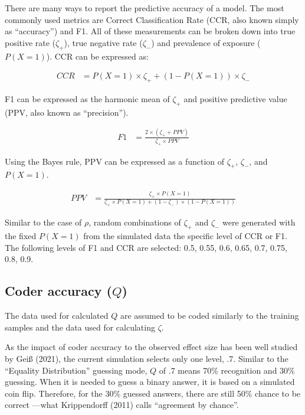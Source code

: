 \documentclass[english,man,floatsintext]{apa6}
\begin{document}
There are many ways to report the predictive accuracy of a model. The most commonly used metrics are Correct Classification Rate (CCR, also known simply as \enquote{accuracy}) and F1. All of these measurements can be broken down into true positive rate (\(\zeta_{+}\)), true negative rate (\(\zeta_{-}\)) and prevalence of exposure (\(P(X = 1)\)). CCR can be expressed as:

\begin{align}
  CCR &= P(X = 1) \times \zeta_{+} + (1 - P(X = 1)) \times \zeta_{-}
\end{align}

F1 can be expressed as the harmonic mean of \(\zeta_{+}\) and positive predictive value (PPV, also known as \enquote{precision}).

\begin{align}
  \label{eq:ppv}
  F1 &= \frac{2 \times (\zeta_{+} + PPV)}{\zeta_{+} \times PPV}
\end{align}

Using the Bayes rule, PPV can be expressed as a function of \(\zeta_{+}\), \(\zeta_{-}\), and \(P(X = 1)\).

\begin{align}
  PPV &= \frac{\zeta_{+} \times P(X = 1)}{\zeta_{+} \times P(X = 1) + (1 - \zeta_{-}) \times (1 - P(X = 1))}
\end{align}

Similar to the case of \(\rho\), random combinations of \(\zeta_{+}\) and \(\zeta_{-}\) were generated with the fixed \(P(X = 1)\) from the simulated data the specific level of CCR or F1. The following levels of F1 and CCR are selected: 0.5, 0.55, 0.6, 0.65, 0.7, 0.75, 0.8, 0.9.

\hypertarget{coder-accuracy-q}{%
\subsection{\texorpdfstring{Coder accuracy (\(Q\))}{Coder accuracy (Q)}}\label{coder-accuracy-q}}

The data used for calculated \(Q\) are assumed to be coded similarly to the training samples and the data used for calculating \(\zeta\).

As the impact of coder accuracy to the observed effect size has been well studied by Geiß (2021), the current simulation selects only one level, .7. Similar to the \enquote{Equality Distribution} guessing mode, \(Q\) of .7 means 70\% recognition and 30\% guessing. When it is needed to guess a binary answer, it is based on a simulated coin flip. Therefore, for the 30\% guessed answers, there are still 50\% chance to be correct ---what Krippendorff (2011) calls \enquote{agreement by chance}.
\end{document}
